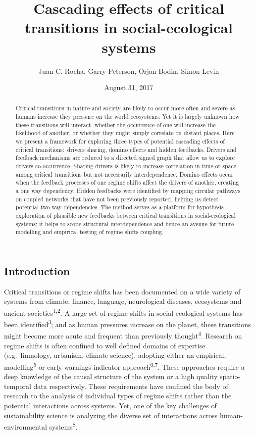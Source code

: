 \documentclass[9pt,]{article}
\title{Cascading effects of critical transitions in social-ecological systems}
\author{Juan C. Rocha, Garry Peterson, Örjan Bodin, Simon Levin}
\date{August 31, 2017}
\begin{document}
\maketitle
\begin{abstract}
Critical transitions in nature and society are likely to occur more
often and severe as humans increase they pressure on the world
ecosystems. Yet it is largely unknown how these transitions will
interact, whether the occurrence of one will increase the likelihood of
another, or whether they might simply correlate on distant places. Here
we present a framework for exploring three types of potential cascading
effects of critical transitions\(:\) drivers sharing, domino effects and
hidden feedbacks. Drivers and feedback mechanisms are reduced to a
directed signed graph that allow us to explore drivers co-occurrence.
Sharing drivers is likely to increase correlation in time or space among
critical transitions but not necessarily interdependence. Domino effects
occur when the feedback processes of one regime shifts affect the
drivers of another, creating a one way dependency. Hidden feedbacks were
identified by mapping circular pathways on coupled networks that have
not been previously reported, helping us detect potential two way
dependencies. The method serves as a platform for hypothesis exploration
of plausible new feedbacks between critical transitions in
social-ecological systems; it helps to scope structural interdependence
and hence an avenue for future modelling and empirical testing of regime
shifts coupling.
\end{abstract}

\subsection{Introduction}\label{introduction}

Critical transitions or regime shifts has been documented on a wide
variety of systems from climate, finance, language, neurological
diseases, ecosystems and ancient societies\textsuperscript{1,2}. A large
set of regime shifts in social-ecological systems has been
identified\textsuperscript{3}; and as human pressures increase on the
planet, these transitions might become more acute and frequent than
previously thought\textsuperscript{4}. Research on regime shifts is
often confined to well defined domains of expertise (e.g.~limnology,
urbanism, climate science), adopting either an empirical,
modelling\textsuperscript{5} or early warnings indicator
approach\textsuperscript{6,7}. These approaches require a deep knowledge
of the causal structure of the system or a high quality spatio-temporal
data respectively. These requirements have confined the body of research
to the analysis of individual types of regime shifts rather than the
potential interactions across systems. Yet, one of the key challenges of
sustainability science is analyzing the diverse set of interactions
across human-environmental systems\textsuperscript{8}.
\end{document}
